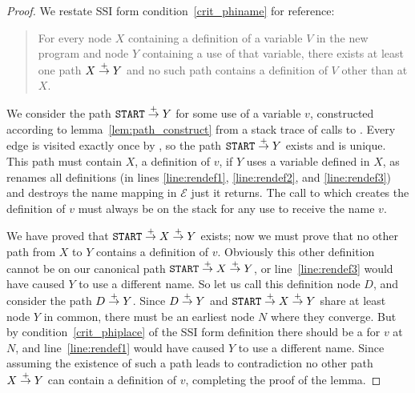 \documentclass[12pt,titlepage,twoside]{article}
\begin{document}
\begin{proof}
We restate SSI form condition~\ref{crit_phiname} for reference:
\begin{quote}
For every node $X$ containing a definition of a variable $V$ in
the new program and node $Y$ containing a use of that variable, there
exists at least one path $X \stackrel{+}{\rightarrow} Y$ and no such path contains a
definition of $V$ other than at $X$.
\end{quote}
We consider the path $\texttt{START}\stackrel{+}{\rightarrow} Y$ for some use of a
variable $v$, constructed according to lemma~\ref{lem:path_construct}
from a stack trace of calls to .  Every edge is visited
exactly once by , so the path $\texttt{START}\stackrel{+}{\rightarrow} Y$
exists and is unique.  This path must contain $X$, a definition of
$v$, if $Y$ uses a variable defined in $X$, as  renames
all definitions (in lines \ref{line:rendef1}, \ref{line:rendef2}, and
\ref{line:rendef3}) and destroys the name mapping in $\mathcal{E}$
just it returns.  The call to  which creates the
definition of $v$ must always be on the stack for any use to receive
the name $v$.

We have proved that $\texttt{START}\stackrel{+}{\rightarrow} X\stackrel{+}{\rightarrow} Y$ exists; now
we must prove that no other path from $X$ to $Y$ contains a definition
of $v$.  Obviously this other definition cannot be on our canonical
path $\texttt{START}\stackrel{+}{\rightarrow} X\stackrel{+}{\rightarrow} Y$, or line~\ref{line:rendef3}
would have caused $Y$ to use a different name.  So let us call this
definition node $D$, and consider the path $D\stackrel{+}{\rightarrow} Y$.  Since
$D\stackrel{+}{\rightarrow} Y$ and $\texttt{START}\stackrel{+}{\rightarrow} X\stackrel{+}{\rightarrow} Y$ share at least
node $Y$ in common, there must be an earliest node $N$ where they
converge.  But by condition~\ref{crit_phiplace} of the SSI form
definition there should be a \phifunction for $v$ at $N$, and
line~\ref{line:rendef1} would have caused $Y$ to use a different name.
Since assuming the existence of such a path leads to contradiction no
other path $X\stackrel{+}{\rightarrow} Y$ can contain a definition of $v$, completing
the proof of the lemma.
\end{proof}
\end{document}
